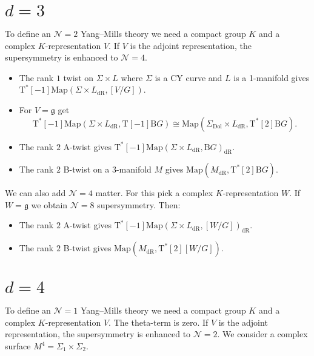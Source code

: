 \documentclass[12pt]{amsart}
\newcommand{\B}{\mathrm{B}}
\newcommand{\g}{\mathfrak{g}}
\newcommand{\cN}{\mathcal{N}}
\newcommand{\T}{\mathrm{T}}
\newcommand{\Dol}{\mathrm{Dol}}
\newcommand{\dR}{\mathrm{dR}}
\newcommand{\Map}{\mathrm{Map}}
\theoremstyle{definition}
\theoremstyle{remark}
\begin{document}
\section{$d=3$}

To define an $\cN=2$ Yang--Mills theory we need a compact group $K$ and a complex $K$-representation $V$. If $V$ is the adjoint representation, the supersymmetry is enhanced to $\cN=4$.

\begin{itemize}
\item The rank $1$ twist on $\Sigma\times L$ where $\Sigma$ is a CY curve and $L$ is a 1-manifold gives $\T^*[-1]\Map(\Sigma\times L_{\dR}, [V/G])$.

\item For $V=\g$ get
\[\T^*[-1]\Map(\Sigma\times L_{\dR}, \T[-1]\B G)\cong \Map(\Sigma_{\Dol}\times L_{\dR}, \T^*[2] \B G).\]

\item The rank $2$ A-twist gives $\T^*[-1]\Map(\Sigma\times L_{\dR}, \B G)_{\dR}$.

\item The rank $2$ B-twist on a 3-manifold $M$ gives $\Map(M_{\dR}, \T^*[2] \B G)$.
\end{itemize}

We can also add $\cN=4$ matter. For this pick a complex $K$-representation $W$. If $W=\g$ we obtain $\cN=8$ supersymmetry. Then:

\begin{itemize}
\item The rank $2$ A-twist gives $\T^*[-1]\Map(\Sigma\times L_{\dR}, [W/G])_{\dR}$.

\item The rank $2$ B-twist gives $\Map(M_{\dR}, \T^*[2] [W/G])$.
\end{itemize}

\section{$d=4$}

To define an $\cN=1$ Yang--Mills theory we need a compact group $K$ and a complex $K$-representation $V$. The theta-term is zero. If $V$ is the adjoint representation, the supersymmetry is enhanced to $\cN=2$. We consider a complex surface $M^4=\Sigma_1\times \Sigma_2$.
\end{document}
